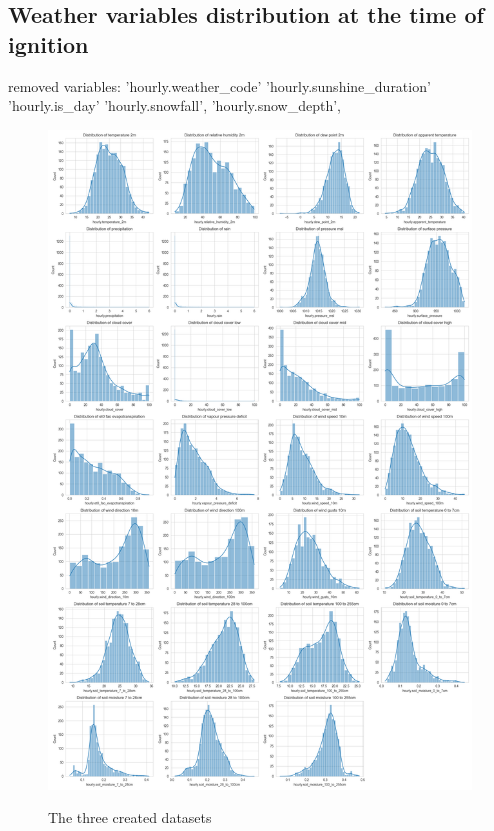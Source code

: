  




\subsection{Weather variables distribution at the time of ignition}
removed variables: 'hourly.weather\_code' 'hourly.sunshine\_duration' 'hourly.is\_day' 'hourly.snowfall',
'hourly.snow\_depth', 


\begin{figure}[H]
	\caption{The three created datasets}
	\centering
	\includegraphics[width=\textwidth]{chapter-images/5_1-eda/distribution_weather_variables1FT.png}
	\label{fig:distribuiton_weather_variables}
\end{figure}

